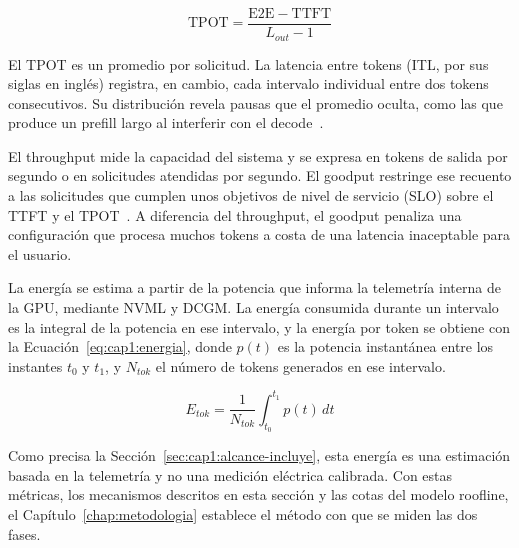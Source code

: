 \begin{equation}
\label{eq:cap1:tpot}
\mathrm{TPOT} = \frac{\mathrm{E2E} - \mathrm{TTFT}}{L_{out} - 1}
\end{equation}

El TPOT es un promedio por solicitud. La latencia entre tokens (ITL, por sus siglas en inglés) registra, en cambio, cada intervalo individual entre dos tokens consecutivos. Su distribución revela pausas que el promedio oculta, como las que produce un prefill largo al interferir con el decode~\cite{agrawal2024sarathi}.

El throughput mide la capacidad del sistema y se expresa en tokens de salida por segundo o en solicitudes atendidas por segundo. El goodput restringe ese recuento a las solicitudes que cumplen unos objetivos de nivel de servicio (SLO) sobre el TTFT y el TPOT~\cite{zhong2024distserve}. A diferencia del throughput, el goodput penaliza una configuración que procesa muchos tokens a costa de una latencia inaceptable para el usuario.

La energía se estima a partir de la potencia que informa la telemetría interna de la GPU, mediante NVML y DCGM. La energía consumida durante un intervalo es la integral de la potencia en ese intervalo, y la energía por token se obtiene con la Ecuación~\ref{eq:cap1:energia}, donde $p(t)$ es la potencia instantánea entre los instantes $t_0$ y $t_1$, y $N_{tok}$ el número de tokens generados en ese intervalo.

\begin{equation}
\label{eq:cap1:energia}
E_{tok} = \frac{1}{N_{tok}} \int_{t_0}^{t_1} p(t)\, dt
\end{equation}

Como precisa la Sección~\ref{sec:cap1:alcance-incluye}, esta energía es una estimación basada en la telemetría y no una medición eléctrica calibrada. Con estas métricas, los mecanismos descritos en esta sección y las cotas del modelo roofline, el Capítulo~\ref{chap:metodologia} establece el método con que se miden las dos fases.
